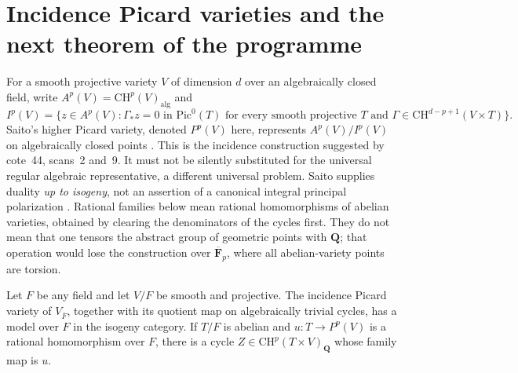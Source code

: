 
\section{Incidence Picard varieties and the next theorem of the programme}

For a smooth projective variety $V$ of dimension $d$ over an algebraically
closed field, write $A^p(V)=\mathrm{CH}^p(V)_{\mathrm{alg}}$ and
\[
 I^p(V)=\{z\in A^p(V):\Gamma_*z=0\text{ in }\mathrm{Pic}^0(T)
 \text{ for every smooth projective }T
 \text{ and }\Gamma\in\mathrm{CH}^{d-p+1}(V\times T)\}.
\]
Saito's higher Picard variety, denoted $P^p(V)$ here, represents
$A^p(V)/I^p(V)$ on algebraically closed points
\cite[Theorem~(3.6)(i)]{Saito1979}.
This is the incidence construction suggested by cote~44, scans~2 and~9.
It must not be silently substituted for the universal regular algebraic
representative, a different universal problem.  Saito supplies duality
\emph{up to isogeny}, not an assertion of a canonical integral principal
polarization \cite[Proposition~(4.4)]{Saito1979}.
Rational families below mean rational homomorphisms of abelian varieties,
obtained by clearing the denominators of the cycles first.  They do not
mean that one tensors the abstract group of geometric points with
$\mathbf Q$; that operation would lose the construction over
$\overline{\mathbf F}_p$, where all abelian-variety points are torsion.

\begin{lemma}
\label{jac:P00}
Let $F$ be any field and let $V/F$ be smooth and projective.  The
incidence Picard variety of $V_{\overline F}$, together with its quotient
map on algebraically trivial cycles, has a model over $F$ in the isogeny
category.  If $T/F$ is abelian and $u:T\to P^p(V)$ is a rational
homomorphism over $F$, there is a cycle
$Z\in\mathrm{CH}^p(T\times V)_{\mathbf Q}$ whose family map is $u$.
\end{lemma}

